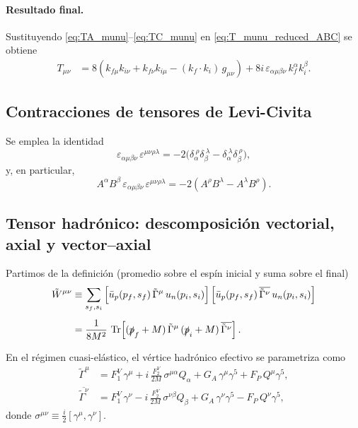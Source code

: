 \paragraph{Resultado final.}
Sustituyendo \eqref{eq:TA_munu}--\eqref{eq:TC_munu} en \eqref{eq:T_munu_reduced_ABC} se obtiene
\begin{align}
T_{\mu\nu}
&=8\left(k_{f\mu}k_{i\nu}+k_{f\nu}k_{i\mu}-(k_f\!\cdot\!k_i)\,g_{\mu\nu}\right)
+8i\,\varepsilon_{\alpha\mu\beta\nu}\,k_f^\alpha k_i^\beta.
\label{eq:T_munu_final_ABC}
\end{align}

\subsection{Contracciones de tensores de Levi-Civita}
Se emplea la identidad
\begin{equation}
\varepsilon_{\alpha\mu\beta\nu}\,\varepsilon^{\mu\nu\rho\lambda}
=-2\Big(\delta_\alpha^{\ \rho}\delta_\beta^{\ \lambda}-\delta_\alpha^{\ \lambda}\delta_\beta^{\ \rho}\Big),
\end{equation}
y, en particular,
\begin{equation}
A^\alpha B^\beta\,\varepsilon_{\alpha\mu\beta\nu}\,\varepsilon^{\mu\nu\rho\lambda}
=-2\left(A^\rho B^\lambda - A^\lambda B^\rho\right).
\end{equation}

\subsection{Tensor hadrónico: descomposición vectorial, axial y vector--axial}
\label{app:tensor_hadronico}

Partimos de la definición (promedio sobre el espín inicial y suma sobre el final)
\begin{align}
\tilde{W}^{\mu \nu}
&\equiv
\sum_{s_f,s_i}
\Big[\bar{u}_p(p_f,s_f)\,\tilde{\Gamma}^{\mu}\,u_n(p_i,s_i)\Big]\,
\Big[\bar{u}_p(p_f,s_f)\,\overline{\tilde{\Gamma}^{\nu}}\,u_n(p_i,s_i)\Big]
\nonumber\\[4pt]
&=
\frac{1}{8M^2}\,
\Tr\!\left[(\slashed{p}_f+M)\,\tilde{\Gamma}^{\mu}\,(\slashed{p}_i+M)\,\overline{\tilde{\Gamma}^{\nu}}\right].
\label{eq:Wtilde_r0_trace}
\end{align}

En el régimen cuasi-elástico, el vértice hadrónico efectivo se parametriza como
\begin{align}
\tilde{\Gamma}^{\mu}
&=
F_1^V\,\gamma^{\mu}
+i\,\frac{F_2^V}{2M}\,\sigma^{\mu\alpha}Q_\alpha
+G_A\,\gamma^{\mu}\gamma^{5}
+F_P\,Q^{\mu}\gamma^{5},
\label{eq:Gammatilde_r}\\[4pt]
\overline{\tilde{\Gamma}^{\nu}}
&=
F_1^V\,\gamma^{\nu}
-i\,\frac{F_2^V}{2M}\,\sigma^{\nu\beta}Q_\beta
+G_A\,\gamma^{\nu}\gamma^{5}
-F_P\,Q^{\nu}\gamma^{5},
\label{eq:Gammatilde_0}
\end{align}
donde \(\sigma^{\mu\nu}\equiv \frac{i}{2}[\gamma^\mu,\gamma^\nu]\).

